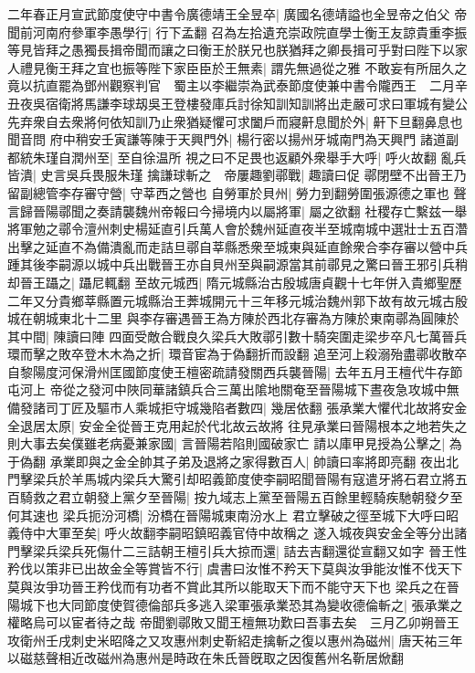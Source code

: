 二年春正月宣武節度使守中書令廣德靖王全昱卒|{
	廣國名德靖謚也全昱帝之伯父}
帝聞前河南府參軍李愚學行|{
	行下孟翻}
召為左拾遺充崇政院直學士衡王友諒貴重李振等見皆拜之愚獨長揖帝聞而讓之曰衡王於朕兄也朕猶拜之卿長揖可乎對曰陛下以家人禮見衡王拜之宜也振等陛下家臣臣於王無素|{
	謂先無過從之雅}
不敢妄有所屈久之竟以抗直罷為鄧州觀察判官　蜀主以李繼崇為武泰節度使兼中書令隴西王　二月辛丑夜吳宿衛將馬謙李球刼吳王登樓發庫兵討徐知訓知訓將出走嚴可求曰軍城有變公先弃衆自去衆將何依知訓乃止衆猶疑懼可求闔戶而寢鼾息聞於外|{
	鼾下旦翻鼻息也聞音問}
府中稍安壬寅謙等陳于天興門外|{
	楊行密以揚州牙城南門為天興門}
諸道副都統朱瑾自潤州至|{
	至自徐温所}
視之曰不足畏也返顧外衆舉手大呼|{
	呼火故翻}
亂兵皆潰|{
	史言吳兵畏服朱瑾}
擒謙球斬之　帝屢趣劉鄩戰|{
	趣讀曰促}
鄩閉壁不出晉王乃留副總管李存審守營|{
	守莘西之營也}
自勞軍於貝州|{
	勞力到翻勞圍張源德之軍也}
聲言歸晉陽鄩聞之奏請襲魏州帝報曰今掃境内以屬將軍|{
	屬之欲翻}
社稷存亡繫兹一舉將軍勉之鄩令澶州刺史楊延直引兵萬人會於魏州延直夜半至城南城中選壯士五百濳出擊之延直不為備潰亂而走詰旦鄩自莘縣悉衆至城東與延直餘衆合李存審以營中兵踵其後李嗣源以城中兵出戰晉王亦自貝州至與嗣源當其前鄩見之驚曰晉王邪引兵稍却晉王躡之|{
	躡尼輒翻}
至故元城西|{
	隋元城縣治古殷城唐貞觀十七年併入貴鄉聖歷二年又分貴鄉莘縣置元城縣治王莾城開元十三年移元城治魏州郭下故有故元城古殷城在朝城東北十二里}
與李存審遇晉王為方陳於西北存審為方陳於東南鄩為圓陳於其中間|{
	陳讀曰陣}
四面受敵合戰良久梁兵大敗鄩引數十騎突圍走梁步卒凡七萬晉兵環而擊之敗卒登木木為之折|{
	環音宦為于偽翻折而設翻}
追至河上殺溺殆盡鄩收散卒自黎陽度河保滑州匡國節度使王檀密疏請發關西兵襲晉陽|{
	去年五月王檀代牛存節屯河上}
帝從之發河中陜同華諸鎮兵合三萬出隂地關奄至晉陽城下晝夜急攻城中無備發諸司丁匠及驅市人乘城拒守城幾陷者數四|{
	幾居依翻}
張承業大懼代北故將安金全退居太原|{
	安金全從晉王克用起於代北故云故將}
往見承業曰晉陽根本之地若失之則大事去矣僕雖老病憂兼家國|{
	言晉陽若陷則國破家亡}
請以庫甲見授為公擊之|{
	為于偽翻}
承業即與之金全帥其子弟及退將之家得數百人|{
	帥讀曰率將即亮翻}
夜出北門擊梁兵於羊馬城内梁兵大驚引却昭義節度使李嗣昭聞晉陽有寇遣牙將石君立將五百騎救之君立朝發上黨夕至晉陽|{
	按九域志上黨至晉陽五百餘里輕騎疾馳朝發夕至何其速也}
梁兵扼汾河橋|{
	汾橋在晉陽城東南汾水上}
君立擊破之徑至城下大呼曰昭義侍中大軍至矣|{
	呼火故翻李嗣昭鎮昭義官侍中故稱之}
遂入城夜與安金全等分出諸門擊梁兵梁兵死傷什二三詰朝王檀引兵大掠而還|{
	詰去吉翻還從宣翻又如字}
晉王性矜伐以策非已出故金全等賞皆不行|{
	虞書曰汝惟不矜天下莫與汝爭能汝惟不伐天下莫與汝爭功晉王矜伐而有功者不賞此其所以能取天下而不能守天下也}
梁兵之在晉陽城下也大同節度使賀德倫部兵多逃入梁軍張承業恐其為變收德倫斬之|{
	張承業之權略烏可以宦者待之哉}
帝聞劉鄩敗又聞王檀無功歎曰吾事去矣　三月乙卯朔晉王攻衛州壬戌刺史米昭降之又攻惠州刺史靳紹走擒斬之復以惠州為磁州|{
	唐天祐三年以磁慈聲相近改磁州為惠州是時政在朱氏晉旣取之因復舊州名靳居焮翻}
